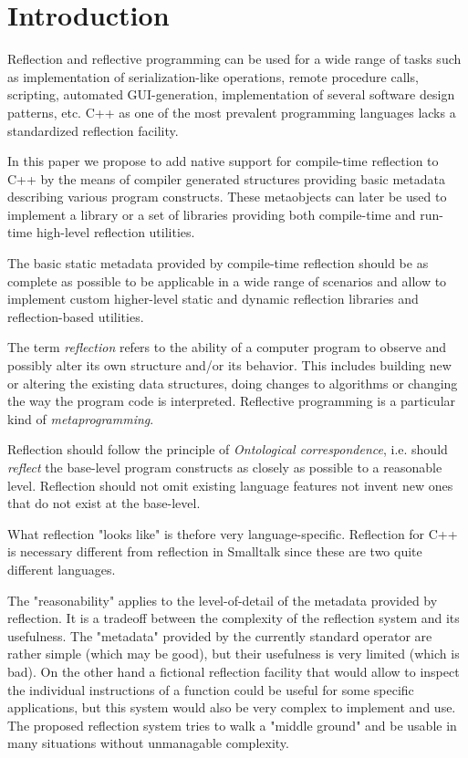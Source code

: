 \section{Introduction}
\label{section-introduction}

Reflection and reflective programming can be used
for a wide range of tasks such as implementation of serialization-like operations,
remote procedure calls, scripting, automated GUI-generation,
implementation of several software design patterns, etc.
C++ as one of the most prevalent programming languages 
lacks a standardized reflection facility.

In this paper we propose to add native support for
compile-time reflection to C++ by the means of compiler generated
structures providing basic metadata describing various program constructs.
These metaobjects can later be used to implement a library or
a set of libraries providing both compile-time and run-time high-level
reflection utilities.

The basic static metadata provided by compile-time reflection
should be as complete as possible to be applicable in a wide
range of scenarios and allow to implement custom higher-level
static and dynamic reflection libraries and reflection-based
utilities.

The term \emph{reflection} refers to the ability of a computer program
to observe and possibly alter its own structure and/or its behavior.
This includes building new or altering the existing data structures,
doing changes to algorithms or changing the way the program code
is interpreted. Reflective programming is a particular kind
of \emph{metaprogramming}.

Reflection should follow the principle of {\em Ontological correspondence},
i.e. should {\em reflect} the base-level program constructs as closely
as possible to a reasonable level.
Reflection should not omit existing language features not invent new
ones that do not exist at the base-level.

What reflection "looks like" is thefore very language-specific.
Reflection for C++ is necessary different from reflection in Smalltalk
since these are two quite different languages.

The "reasonability" applies to the level-of-detail of the metadata
provided by reflection. It is a tradeoff between the complexity
of the reflection system and its usefulness. The "metadata" provided
by the currently standard \verb@typeid@ operator are rather simple
(which may be good), but their usefulness is very limited (which
is bad). On the other hand a fictional reflection facility that would
allow to inspect the individual instructions of a function could
be useful for some specific applications, but this system would
also be very complex to implement and use.
The proposed reflection system tries to walk a "middle ground"
and be usable in many situations without unmanagable complexity.


